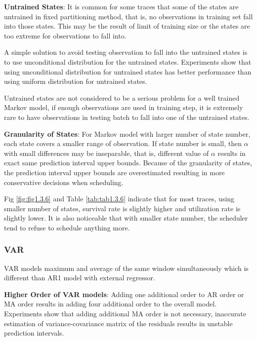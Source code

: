 \documentclass{article}
\begin{document}
\begin{flushleft}
\textbf{Untrained States}: It is common for some traces that some of the states are untrained in fixed partitioning method, that is, no observations in training set fall into those states. This may be the result of limit of training size or the states are too extreme for observations to fall into. 

A simple solution to avoid testing observation to fall into the untrained states is to use unconditional distribution for the untrained states. Experiments show that using unconditional distribution for untrained states has better performance than using uniform distribution for untrained states.

Untrained states are not considered to be a serious problem for a well trained Markov model, if enough observations are used in training step, it is extremely rare to have observations in testing batch to fall into one of the untrained states.
\end{flushleft}

\begin{flushleft}
\textbf{Granularity of States}: For Markov model with larger number of state number, each state covers a smaller range of observation. If state number is small, then $\alpha$ with small differences may be inseparable, that is, different value of $\alpha$ results in exact same prediction interval upper bounds. Because of the granularity of states, the prediction interval upper bounds are overestimated resulting in more conservative decisions when scheduling.

Fig \ref{fig:fig1.3.6} and Table \ref{tab:tab1.3.6} indicate that for most traces, using smaller number of states, survival rate is slightly higher and utilization rate is slightly lower. It is also noticeable that with smaller state number, the scheduler tend to refuse to schedule anything more.
\end{flushleft}

\subsubsection{VAR}

\begin{flushleft}
VAR models maximum and average of the same window simultaneously which is different than AR1 model with external regressor.
\end{flushleft}

\begin{flushleft}
\textbf{Higher Order of VAR models}: Adding one additional order to AR order or MA order results in adding four additional order to the overall model. Experiments show that adding additional MA order is not necessary, inaccurate estimation of variance-covariance matrix of the residuals results in unstable prediction intervals.
\end{flushleft}
\end{document}
